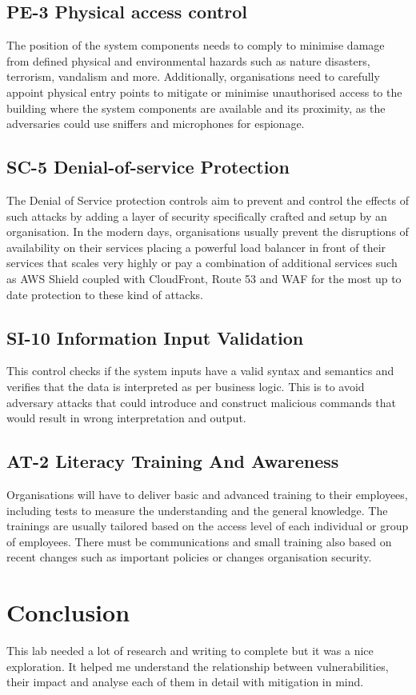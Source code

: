 \subsection{PE-3 Physical access control}
\label{lab4-sub-3}
The position of the system components needs to comply to minimise damage from
defined physical and environmental hazards such as nature disasters, terrorism,
vandalism and more. Additionally, organisations need to carefully appoint
physical entry points to mitigate or minimise unauthorised access to the
building where the system components are available and its proximity, as the
adversaries could use sniffers and microphones for espionage.

\subsection{SC-5 Denial-of-service Protection}
\label{lab4-sub-4}
The Denial of Service protection controls aim to prevent and control the effects
of such attacks by adding a layer of security specifically crafted and setup by
an organisation. In the modern days, organisations usually prevent the
disruptions of availability on their services placing a powerful load balancer
in front of their services that scales very highly or pay a combination of
additional services such as AWS Shield coupled with CloudFront, Route 53 and WAF
for the most up to date protection to these kind of attacks.

\subsection{SI-10 Information Input Validation}
\label{lab4-sub-5}

This control checks if the system inputs have a valid syntax and semantics and
verifies that the data is interpreted as per business logic. This is to avoid
adversary attacks that could introduce and construct malicious commands that
would result in wrong interpretation and output.

\subsection{AT-2 Literacy Training And Awareness}
\label{lab4-sub-6}
Organisations will have to deliver basic and advanced training to their
employees, including tests to measure the understanding and the general
knowledge. The trainings are usually tailored based on the access level of each
individual or group of employees. There must be communications and small
training also based on recent changes such as important policies or changes
organisation security.

\section{Conclusion}
\label{lab4-conclusion}
This lab needed a lot of research and writing to complete but it was a nice
exploration. It helped me understand the relationship between vulnerabilities,
their impact and analyse each of them in detail with mitigation in mind.
